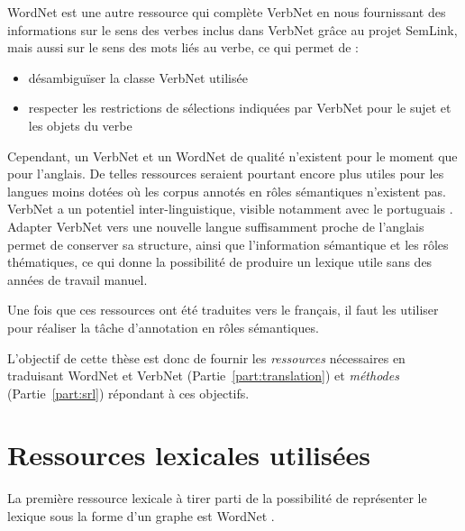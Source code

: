 WordNet est une autre ressource qui complète VerbNet en nous fournissant des
informations sur le sens des verbes inclus dans VerbNet grâce au projet
SemLink, mais aussi sur le sens des mots liés au verbe, ce qui permet de :

\begin{itemize}

    \item désambiguïser la classe VerbNet utilisée

    \item respecter les restrictions de sélections indiquées par VerbNet pour
        le sujet et les objets du verbe

\end{itemize}


Cependant, un VerbNet et un WordNet de qualité n'existent pour le moment que
pour l'anglais. De telles ressources seraient pourtant encore plus utiles pour
les langues moins dotées où les corpus annotés en rôles sémantiques n'existent
pas. VerbNet a un potentiel inter-linguistique, visible notamment avec le
portuguais \citep[section 2.2.2]{kipperschuler2005verbnet}. Adapter VerbNet
vers une nouvelle langue suffisamment proche de l'anglais permet de conserver
sa structure, ainsi que l'information sémantique et les rôles thématiques, ce
qui donne la possibilité de produire un lexique utile sans des années de
travail manuel.

Une fois que ces ressources ont été traduites vers le français, il faut les
utiliser pour réaliser la tâche d'annotation en rôles sémantiques.

L'objectif de cette thèse est donc de fournir les \emph{ressources} nécessaires
en traduisant WordNet et VerbNet (Partie~\ref{part:translation}) et
\emph{méthodes} (Partie~\ref{part:srl}) répondant à ces objectifs.

\section{Ressources lexicales utilisées}

La première ressource lexicale à tirer parti de la possibilité de représenter
le lexique sous la forme d'un graphe est WordNet \citep{fellbaum1998wordnet}.

